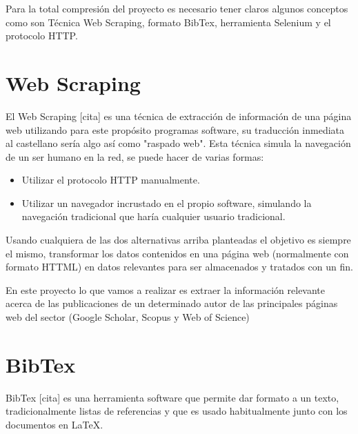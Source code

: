 
Para la total compresión del proyecto es necesario tener claros algunos conceptos como son Técnica Web Scraping, formato BibTex, herramienta Selenium y el protocolo HTTP.

\section{Web Scraping}

El Web Scraping [cita] es una técnica de extracción de información de una página web utilizando para este propósito programas software, su traducción inmediata al castellano sería algo así como "raspado web".
Esta técnica simula la navegación de un ser humano en la red, se puede hacer de varias formas:
\begin{itemize}
	\item Utilizar el protocolo HTTP manualmente.
	\item Utilizar un navegador incrustado en el propio software, simulando la navegación tradicional que haría cualquier usuario tradicional.
\end{itemize}

Usando cualquiera de las dos alternativas arriba planteadas el objetivo es siempre el mismo, transformar los datos contenidos en una página web (normalmente con formato HTTML) en datos relevantes para ser almacenados y tratados con un fin.

En este proyecto lo que vamos a realizar es extraer la información relevante acerca de las publicaciones de un determinado autor de las principales páginas web del sector (Google Scholar, Scopus y Web of Science)

\section{BibTex}
BibTex [cita] es una herramienta software que permite dar formato a un texto, tradicionalmente listas de referencias y que es usado habitualmente junto con los documentos en LaTeX.

